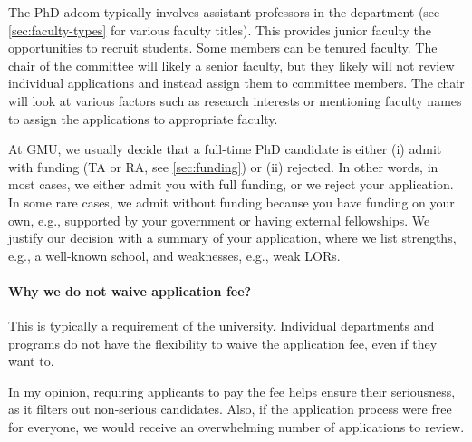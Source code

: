 \documentclass[oneside,11pt]{memoir}
\newenvironment{commentbox}[1][]{
  \small
  \begin{mybox}
    {\small \textbf{#1}}
  }{
  \end{mybox}
}
\newcommand{\mycomment}[3][\color{blue}]{{#1{{#2}: {#3}}}}
\newcommand{\didi}[1]{\mycomment{Didier}{#1}}{}
\begin{document}
The PhD adcom typically involves assistant professors in the department (see \autoref{sec:faculty-types} for various faculty titles). This provides junior faculty the opportunities to recruit students. Some members can be tenured faculty. The chair of the committee will likely a senior faculty, but they likely will not review individual applications and instead assign them to committee members. The chair will look at various factors such as research interests or mentioning faculty names to assign the applications to appropriate faculty.

At GMU, we usually decide that a full-time PhD candidate is either (i) admit with funding (TA or RA, see \autoref{sec:funding}) or (ii) rejected. In other words, in most cases, we either
admit you with full funding, or we reject your application. In some rare cases, we admit
without funding because you have funding on your own, e.g.,
supported by your government or having external fellowships. We justify
our decision with a summary of your application, where we list
strengths, e.g., a well-known school, and weaknesses, e.g., weak
LORs.



\paragraph{Why we do not waive application fee?}  This is typically a requirement of the university. Individual departments and programs do not have the flexibility to waive the application fee, even if they want to. 

In my opinion, requiring applicants to pay the fee helps ensure their seriousness, as it filters out non-serious candidates. Also, if the application process were free for everyone, we would receive an overwhelming number of applications to review.


\end{document}

